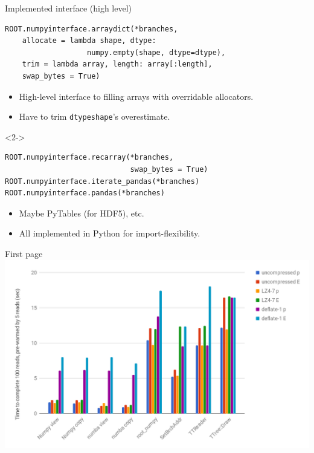 \documentclass{beamer}
\begin{document}
\begin{frame}[fragile]{Implemented interface (high level)}
\vspace{0.5 cm}
\small
\begin{verbatim}
ROOT.numpyinterface.arraydict(*branches,
    allocate = lambda shape, dtype:
                   numpy.empty(shape, dtype=dtype),
    trim = lambda array, length: array[:length],
    swap_bytes = True)
\end{verbatim}
\normalsize
\begin{itemize}
\item High-level interface to filling arrays with overridable allocators.
\item Have to trim {\tt\small dtypeshape}'s overestimate.
\end{itemize}

\vspace{0.25 cm}
\begin{uncoverenv}<2->
\small
\begin{verbatim}
ROOT.numpyinterface.recarray(*branches,
                             swap_bytes = True)
ROOT.numpyinterface.iterate_pandas(*branches)
ROOT.numpyinterface.pandas(*branches)
\end{verbatim}
\normalsize
\begin{itemize}
\item Maybe PyTables (for HDF5), etc.
\item All implemented in Python for import-flexibility.
\end{itemize}
\end{uncoverenv}
\end{frame}

\begin{frame}{First page}
\vspace{0.5 cm}
\includegraphics[width=1.1\linewidth]{chart.png}
\end{frame}
\end{document}
